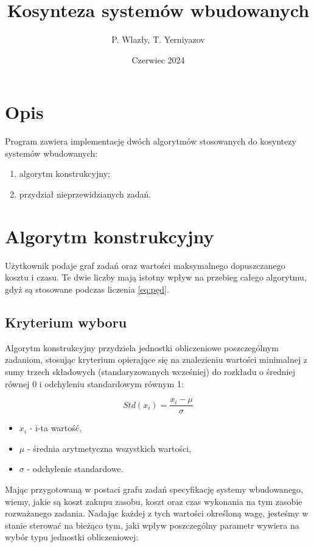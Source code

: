 \documentclass[a4paper,11pt]{article}
\title{Kosynteza systemów wbudowanych}
\author{P. Wlazły, T. Yerniyazov}
\date{Czerwiec 2024}
\begin{document}
\maketitle

\section{Opis}

Program zawiera implementację dwóch algorytmów stosowanych do kosyntezy systemów
wbudowanych:

\begin{enumerate}
    \item algorytm konstrukcyjny;
    \item przydział nieprzewidzianych zadań.
\end{enumerate}

\section{Algorytm konstrukcyjny}
Użytkownik podaje graf zadań oraz wartości maksymalnego dopuszczanego kosztu 
i czasu. Te dwie liczby mają istotny wpływ na przebieg całego algorytmu, gdyż
są stosowane podczas liczenia \ref{eq:pęd}.

\subsection{Kryterium wyboru}
Algorytm konstrukcyjny przydziela jednostki obliczeniowe poszczególnym 
zadaniom, stosując kryterium opierające się na znalezieniu wartości minimalnej 
z sumy trzech składowych (standaryzowanych wcześniej) do rozkładu 
o średniej równej 0 i odchyleniu standardowym równym 1:

\begin{equation}
    {Std}({x_i}) = \frac{x_i - \mu}{\sigma}
\end{equation}
\begin{itemize}
\item \(x_i\) - i-ta wartość,
\item \(\mu\) - średnia arytmetyczna wszystkich wartości,
\item \(\sigma\) - odchylenie standardowe.
\end{itemize}

Mając przygotowaną w postaci grafu zadań specyfikację systemy wbudowanego, wiemy,
jakie są koszt zakupu zasobu, koszt oraz czas wykonania na tym zasobie
rozważanego zadania. Nadając każdej z tych wartości określoną wagę, jesteśmy
w stanie sterować na bieżąco tym, jaki wpływ poszczególny parametr wywiera na
wybór typu jednostki obliczeniowej:
\end{document}
